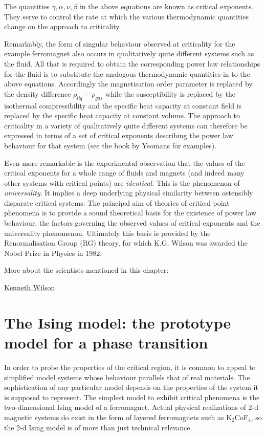 \documentclass[
  letterpaper,
  DIV=11,
  numbers=noendperiod]{scrreprt}
\begin{document}
The quantities \(\gamma, \alpha, \nu, \beta\) in the above equations are
known as critical exponents. They serve to control the rate at which the
various thermodynamic quantities change on the approach to criticality.

Remarkably, the form of singular behaviour observed at criticality for
the example ferromagnet also occurs in qualitatively quite different
systems such as the fluid. All that is required to obtain the
corresponding power law relationships for the fluid is to substitute the
analogous thermodynamic quantities in to the above equations.
Accordingly the magnetisation order parameter is replaced by the density
difference \(\rho_{liq}-\rho_{gas}\) while the susceptibility is
replaced by the isothermal compressibility and the specific heat
capacity at constant field is replaced by the specific heat capacity at
constant volume. The approach to criticality in a variety of
qualitatively quite different systems can therefore be expressed in
terms of a set of critical exponents describing the power law behaviour
for that system (see the book by Yeomans for examples).

Even more remarkable is the experimental observation that the values of
the critical exponents for a whole range of fluids and magnets (and
indeed many other systems with critical points) are \emph{identical}.
This is the phenomenon of \emph{universality}. It implies a deep
underlying physical similarity between ostensibly disparate critical
systems. The principal aim of theories of critical point phenomena is to
provide a sound theoretical basis for the existence of power law
behaviour, the factors governing the observed values of critical
exponents and the universality phenomenon. Ultimately this basis is
provided by the Renormalisation Group (RG) theory, for which K.G. Wilson
was awarded the Nobel Prize in Physics in 1982.

More about the scientists mentioned in this chapter:

\href{https://en.wikipedia.org/wiki/Kenneth_G._Wilson}{Kenneth Wilson}

\chapter{The Ising model: the prototype model for a phase
transition}\label{sec-Isingmodel}

In order to probe the properties of the critical region, it is common to
appeal to simplified model systems whose behaviour parallels that of
real materials. The sophistication of any particular model depends on
the properties of the system it is supposed to represent. The simplest
model to exhibit critical phenomena is the two-dimensional Ising model
of a ferromagnet. Actual physical realizations of 2-d magnetic systems
do exist in the form of layered ferromagnets such as K\(_2\)CoF\(_4\),
so the 2-d Ising model is of more than just technical relevance.
\end{document}
